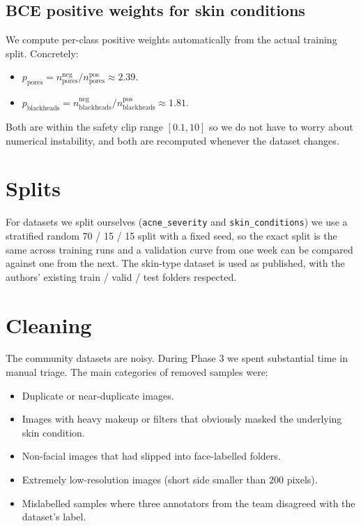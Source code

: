 \documentclass[11pt,a4paper,oneside]{report}
\begin{document}
\subsection{BCE positive weights for skin conditions}

We compute per-class positive weights automatically from the actual
training split. Concretely:

\begin{itemize}
    \item \(p_{\text{pores}} = n^{\text{neg}}_{\text{pores}} /
        n^{\text{pos}}_{\text{pores}} \approx 2.39\).
    \item \(p_{\text{blackheads}} = n^{\text{neg}}_{\text{blackheads}} /
        n^{\text{pos}}_{\text{blackheads}} \approx 1.81\).
\end{itemize}

Both are within the safety clip range \([0.1, 10]\) so we do not
have to worry about numerical instability, and both are recomputed
whenever the dataset changes.

\section{Splits}

For datasets we split ourselves (\texttt{acne\_severity} and
\texttt{skin\_conditions}) we use a stratified random 70 / 15 / 15
split with a fixed seed, so the exact split is the same across
training runs and a validation curve from one week can be compared
against one from the next. The skin-type dataset is used as
published, with the authors' existing train / valid / test folders
respected.

\section{Cleaning}

The community datasets are noisy. During Phase 3 we spent
substantial time in manual triage. The main categories of removed
samples were:

\begin{itemize}
    \item Duplicate or near-duplicate images.
    \item Images with heavy makeup or filters that obviously masked
        the underlying skin condition.
    \item Non-facial images that had slipped into face-labelled
        folders.
    \item Extremely low-resolution images (short side smaller than
        \(200\) pixels).
    \item Mislabelled samples where three annotators from the team
        disagreed with the dataset's label.
\end{itemize}
\end{document}
